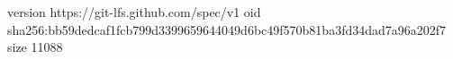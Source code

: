 version https://git-lfs.github.com/spec/v1
oid sha256:bb59dedcaf1fcb799d3399659644049d6bc49f570b81ba3fd34dad7a96a202f7
size 11088
